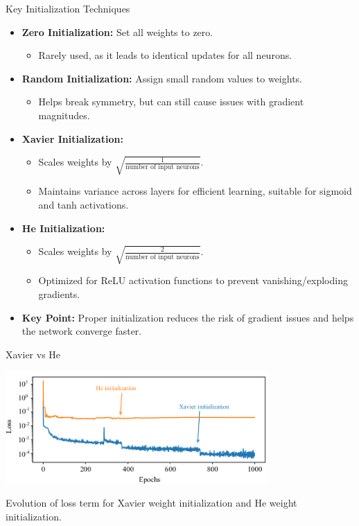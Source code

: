 \documentclass[serif, aspectratio=169]{beamer}
\begin{document}
\begin{frame}{Key Initialization Techniques}

    \begin{itemize}
        \item \textbf{Zero Initialization:} Set all weights to zero. 
        \begin{itemize}
            \item Rarely used, as it leads to identical updates for all neurons.
        \end{itemize}
        
        \item \textbf{Random Initialization:} Assign small random values to weights.
        \begin{itemize}
            \item Helps break symmetry, but can still cause issues with gradient magnitudes.
        \end{itemize}
        
        \item \textbf{Xavier Initialization:} 
        \begin{itemize}
            \item Scales weights by \(\sqrt{\frac{1}{\text{number of input neurons}}}\).
            \item Maintains variance across layers for efficient learning, suitable for sigmoid and tanh activations.
        \end{itemize}
        
        \item \textbf{He Initialization:} 
        \begin{itemize}
            \item Scales weights by \(\sqrt{\frac{2}{\text{number of input neurons}}}\).
            \item Optimized for ReLU activation functions to prevent vanishing/exploding gradients.
        \end{itemize}
        
        \item \textbf{Key Point:} Proper initialization reduces the risk of gradient issues and helps the network converge faster.
    \end{itemize}
    
\end{frame}
\begin{frame}{Xavier vs He}
    \begin{center}
        \includegraphics[width=10cm]{pic/Evolution-of-loss-term-for-Xavier-weight-initialization-and-He-weight-initialization.png}  
    \end{center}
Evolution of loss term for Xavier weight initialization and He weight initialization.
\end{frame}
\end{document}
